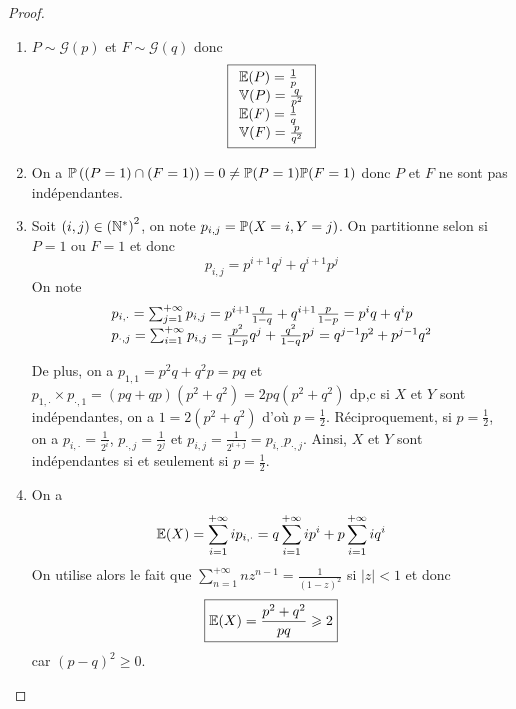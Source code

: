 \begin{proof}
    \phantom{}
    \begin{enumerate}
        \item $P\sim\mathcal{G}(p)$ et $F\sim\mathcal{G}(q)$ donc 
        \begin{equation}
            \boxed{
                \begin{array}[]{l}
                    \E(P)=\frac{1}{p}\\
                    \mathbb{V}(P)=\frac{q}{p^{2}}\\
                    \E(F)=\frac{1}{q}\\
                    \mathbb{V}(F)=\frac{p}{q^{2}}
                \end{array}
            }
        \end{equation}

        \item On a $\P\left((P=1)\cap(F=1)\right)=0\neq\P(P=1)\P(F=1)$ donc $P$ et $F$ ne sont pas indépendantes.
        
        \item Soit $(i,j)\in\left(\N^{*}\right)^{2}$, on note $p_{i,j}=\P(X=i,Y=j)$. On partitionne selon si $P=1$ ou $F=1$ et donc 
        \begin{equation}
            \boxed{p_{i,j}=p^{i+1}q^{j}+q^{i+1}p^{j}}
        \end{equation}
        On note 
        \begin{equation}
            \begin{array}[]{l}
                p_{i,\cdot}=\sum_{j=1}^{+\infty}p_{i,j}=p^{i+1}\frac{q}{1-q}+q^{i+1}\frac{p}{1-p}=p^{i}q+q^{i}p\\
                p_{\cdot,j}=\sum_{i=1}^{+\infty}p_{i,j}=\frac{p^{2}}{1-p}q^{j}+\frac{q^{2}}{1-q}p^{j}=q^{j-1}p^{2}+p^{j-1}q^{2}
            \end{array}
        \end{equation}

        De plus, on a $p_{1,1}=p^{2}q+q^{2}p=pq$ et $p_{1,\cdot}\times p_{\cdot,1}=(pq+qp)(p^{2}+q^{2})=2pq(p^{2}+q^{2})$ dp,c si $X$ et $Y$ sont indépendantes, on a $1=2(p^{2}+q^{2})$ d'où $p=\frac{1}{2}$. Réciproquement, si $p=\frac{1}{2}$, on a $p_{i,\cdot}=\frac{1}{2^{i}}$, $p_{\cdot, j}=\frac{1}{2^{j}}$ et $p_{i,j}=\frac{1}{2^{i+j}}=p_{i,\cdot}p_{\cdot,j}$. Ainsi, $X$ et $Y$ sont indépendantes si et seulement si $p=\frac{1}{2}$.

        \item On a 
        \begin{equation}
            \E(X)=\sum_{i=1}^{+\infty}ip_{i,\cdot}=q\sum_{i=1}^{+\infty}ip^{i}+p\sum_{i=1}^{+\infty}iq^{i}
        \end{equation}
        On utilise alors le fait que $\sum_{n=1}^{+\infty}nz^{n-1}=\frac{1}{(1-z)^{2}}$ si $\left\lvert z\right\rvert<1$ et donc 
        \begin{equation}
            \boxed{\E(X)=\frac{p^{2}+q^{2}}{pq}\geqslant2}
        \end{equation}
        car $(p-q)^{2}\geqslant0$.


\end{enumerate}
\end{proof}
